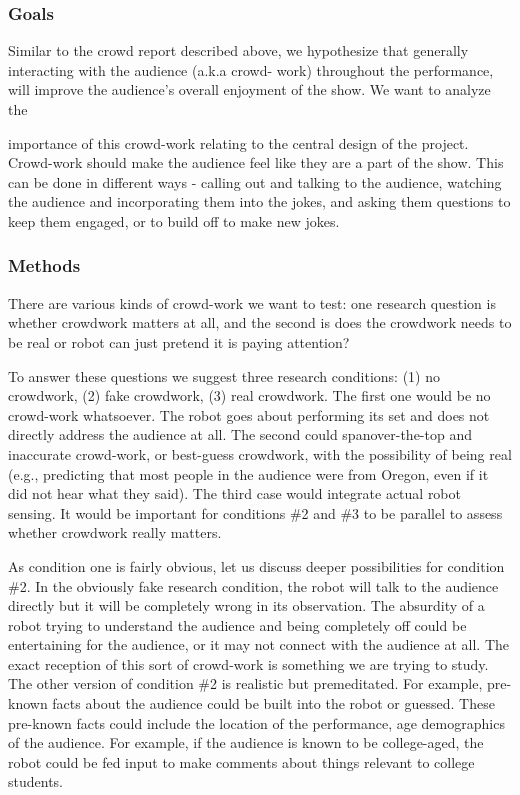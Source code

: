 \documentclass[onecolumn, draftclsnofoot,10pt, compsoc]{IEEEtran}
\begin{document}
\subsubsection{Goals}

Similar to the crowd report described above, we hypothesize that generally interacting with the audience (a.k.a crowd-
work) throughout the performance, will improve the audience’s overall enjoyment of the show. We want to analyze the

importance of this crowd-work relating to the central design of the project. Crowd-work should make the audience feel
like they are a part of the show. This can be done in different ways - calling out and talking to the audience, watching
the audience and incorporating them into the jokes, and asking them questions to keep them engaged, or to build off to
make new jokes.

\subsubsection{Methods}
There are various kinds of crowd-work we want to test: one research question is whether crowdwork matters at all, and
the second is does the crowdwork needs to be real or robot can just pretend it is paying attention?

To answer these questions we suggest three research conditions: (1) no crowdwork, (2) fake crowdwork, (3) real
crowdwork. The first one would be no crowd-work whatsoever. The robot goes about performing its set and does
not directly address the audience at all. The second could spanover-the-top and inaccurate crowd-work, or best-guess
crowdwork, with the possibility of being real (e.g., predicting that most people in the audience were from Oregon, even
if it did not hear what they said). The third case would integrate actual robot sensing. It would be important for
conditions \#2 and \#3 to be parallel to assess whether crowdwork really matters.

As condition one is fairly obvious, let us discuss deeper possibilities for condition \#2. In the obviously fake research
condition, the robot will talk to the audience directly but it will be completely wrong in its observation. The absurdity
of a robot trying to understand the audience and being completely off could be entertaining for the audience, or it may
not connect with the audience at all. The exact reception of this sort of crowd-work is something we are trying to study.
The other version of condition \#2 is realistic but premeditated. For example, pre-known facts about the audience
could be built into the robot or guessed. These pre-known facts could include the location of the performance, age
demographics of the audience. For example, if the audience is known to be college-aged, the robot could be fed input
to make comments about things relevant to college students.
\end{document}
